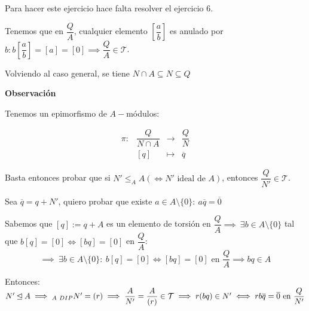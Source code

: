 \documentclass[openany]{book}
\begin{document}
\begin{exercise}
    Para hacer este ejercicio hace falta resolver el ejercicio 6.

    Tenemos que en $ \dfrac{Q}{A}$, cualquier elemento $ \left[ \dfrac{a}{b} \right]$ es anulado por $ b: b \left[ \dfrac{a}{b} \right] = [a] = [0] \implies \dfrac{Q}{A} \in \mathcal{T}$.

    Volviendo al caso general, se tiene $ N \cap A \subseteq N \subseteq Q$

    \begin{flushright}
        \textbf{Observación}
    \end{flushright}
    
    Tenemos un epimorfismo de $ A-$módulos:

    $$ 
    \begin{aligned}
        \pi: &  \dfrac{Q}{N \cap A} & \to & \dfrac{Q}{N}\\ 
        & [q] & \mapsto & \overline{q}
    \end{aligned}
    $$

    Basta entonces probar que si $ N ' \leq_{A}A (\iff N' \text{ ideal de } A) $, entonces $ \dfrac{Q}{N'} \in \mathcal{T}$.

    Sea $ \overline{q} = q + N'$, quiero probar que existe $ a \in A \setminus \{0\}:\ a\overline{q} = \overline{0}$

    Sabemos que $ [q] := q + A$ es un elemento de torsión en $ \dfrac{Q}{A} \implies \ \exists b \in A \setminus \{0\}$ tal que $ b[q] = [0] \iff [bq] = [0]$ en $ \dfrac{Q}{A}$:
    $$ \implies \ \exists b \in A \setminus \{0\} :\ b[q] = [0] \iff [bq] = [0] \text{ en } \dfrac{Q}{A} \implies bq \in A$$

    Entonces:
    $ N' \unlhd A \implies_{A\ DIP} N' = (r) \implies \dfrac{A}{N'} = \dfrac{A}{(r)}  \in \mathcal{T} \implies r(bq) \in N' \iff rb \overline{q} = \overline{0} \text{ en } \dfrac{Q}{N'}$

\end{exercise}


\setcounter{ex}{5}
\end{document}
